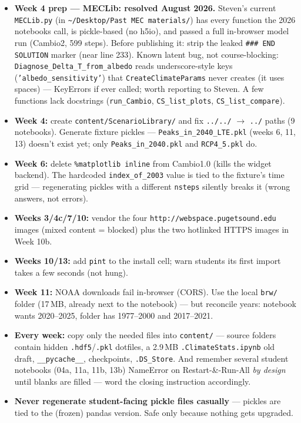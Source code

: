 \documentclass[11pt]{article}
\newcommand{\code}[1]{\texttt{\small #1}}
\begin{document}
\begin{itemize}[itemsep=4pt]
  \item \textbf{Week 4 prep --- MECLib: resolved August 2026.} Steven's
    current \code{MECLib.py} (in
    \code{\textasciitilde/Desktop/Past MEC materials/}) has every function the
    2026 notebooks call, is pickle-based (no h5io), and passed a full
    in-browser model run (Cambio2, 599 steps). Before publishing it: strip the
    leaked \code{\#\#\# END SOLUTION} marker (near line 233). Known latent
    bug, not course-blocking: \code{Diagnose\_Delta\_T\_from\_albedo} reads
    underscore-style keys (\code{'albedo\_sensitivity'}) that
    \code{CreateClimateParams} never creates (it uses spaces) --- KeyErrors if
    ever called; worth reporting to Steven. A few functions lack docstrings
    (\code{run\_Cambio}, \code{CS\_list\_plots}, \code{CS\_list\_compare}).
  \item \textbf{Week 4:} create \code{content/ScenarioLibrary/} and fix
    \code{../../} $\rightarrow$ \code{../} paths (9 notebooks). Generate
    fixture pickles --- \code{Peaks\_in\_2040\_LTE.pkl} (weeks 6, 11, 13)
    doesn't exist yet; only \code{Peaks\_in\_2040.pkl} and \code{RCP4\_5.pkl}
    do.
  \item \textbf{Week 6:} delete \code{\%matplotlib inline} from Cambio1.0
    (kills the widget backend). The hardcoded \code{index\_of\_2003} value is
    tied to the fixture's time grid --- regenerating pickles with a different
    \code{nsteps} silently breaks it (wrong answers, not errors).
  \item \textbf{Weeks 3/4c/7/10:} vendor the four
    \code{http://webspace.pugetsound.edu} images (mixed content = blocked)
    plus the two hotlinked HTTPS images in Week 10b.
  \item \textbf{Weeks 10/13:} add \code{pint} to the install cell; warn
    students its first import takes a few seconds (not hung).
  \item \textbf{Week 11:} NOAA downloads fail in-browser (CORS). Use the local
    \code{brw/} folder (17\,MB, already next to the notebook) --- but
    reconcile years: notebook wants 2020--2025, folder has 1977--2000 and
    2017--2021.
  \item \textbf{Every week:} copy only the needed files into \code{content/}
    --- source folders contain hidden \code{.hdf5}/\code{.pkl} dotfiles, a
    2.9\,MB \code{.ClimateStats.ipynb} old draft, \code{\_\_pycache\_\_},
    checkpoints, \code{.DS\_Store}. And remember several student notebooks
    (04a, 11a, 11b, 13b) NameError on Restart-\&-Run-All \emph{by design}
    until blanks are filled --- word the closing instruction accordingly.
  \item \textbf{Never regenerate student-facing pickle files casually} ---
    pickles are tied to the (frozen) pandas version. Safe only because nothing
    gets upgraded.
\end{itemize}
\end{document}
